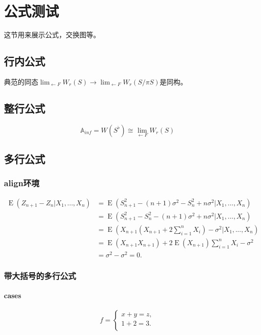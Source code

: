 \section{公式测试}这节用来展示公式，交换图等。
 
\subsection{行内公式}
典范的同态$\lim_{\leftarrow F} W_r(S)\rightarrow \lim_{\leftarrow F} W_r(S/\pi S )$是同构。

\subsection{整行公式}
$$\mathbb{A}_{inf}=W(S^\flat)\cong \lim_{\leftarrow F} W_r(S)$$

\subsection{多行公式}

\subsubsection{align环境}
\begin{align*}
    \operatorname{E} (Z_{n+1} - Z_n | X_1,..., X_n)
    &= \operatorname{E} (S_{n+1}^2 - (n+1) \sigma^2 - S_n^2 + n \sigma^2 | X_1,..., X_n) \\
    &= \operatorname{E} (S_{n+1}^2 - S_n^2 - (n+1) \sigma^2 + n \sigma^2 | X_1,..., X_n) \\
    &= \operatorname{E} (X_{n+1}(X_{n+1} + 2\sum_{i=1}^n X_i) - \sigma^2 | X_1,..., X_n) \\
    &= \operatorname{E} (X_{n+1}X_{n+1})
       + 2\operatorname{E} (X_{n+1}) \sum_{i=1}^n X_i - \sigma^2 \\
    &= \sigma^2  - \sigma^2 =0.
\end{align*}

\subsubsection{带大括号的多行公式}
\paragraph{cases}
$$
    f=
    \begin{cases}
      x + y = z,  \\
      1 + 2 = 3.  \\
    \end{cases}
$$

